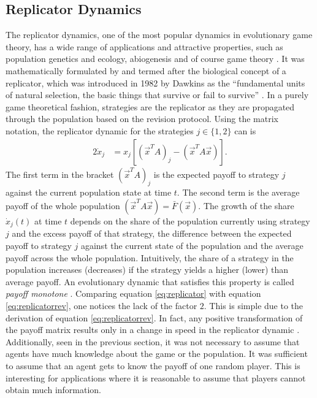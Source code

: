 \subsection{Replicator Dynamics}
\label{sec:replicatordynamic}
The replicator dynamics, one of the most popular dynamics in 
evolutionary game theory, has a wide range of applications and 
attractive properties, such as population genetics and ecology, abiogenesis and
of course game theory \parencite[203]{hofbauer_evolutionary_1998}. 
It was mathematically formulated by \textcite{taylor_evolutionary_1978} and 
termed after the biological concept of a replicator, which was 
introduced in 1982 by Dawkins as the ``fundamental units of natural selection,
the basic things that survive or fail to survive''
\parencite[254]{dawkins_selfish_2016}. In a purely game theoretical fashion,
strategies are the replicator as they are propagated through the population
based on the revision protocol. Using the matrix notation, 
the replicator dynamic  
for the strategies $j \in \{1,2\}$ can is 
\begin{alignat}{2}
        \dot{x}_j &= x_j\left[\left(\vec{x}^T A\right)_j -
        \left(\vec{x}^T A \vec{x}\right)\right]. 
        \label{eq:replicator}
\end{alignat}
The first term in the bracket $(\vec{x}^T A)_j$ is the expected payoff to 
strategy $j$ against the current population state at time $t$. The second
term is the average payoff of the whole population 
$(\vec{x}^T A \vec{x}) =\bar{F}(\vec{x})$.
The growth of the share $\dot{x}_j(t)$ at time $t$ depends 
on the share of the population currently using strategy $j$ and the 
excess payoff of that strategy, the difference between the expected 
payoff to strategy $j$ against the current state of the population and the
average payoff across the whole population.
Intuitively, the share of a strategy in the population increases (decreases) 
if the strategy yields a higher (lower) than average payoff. 
An evolutionary dynamic that satisfies this property is called 
\textit{payoff monotone} \parencite[30]{szabo_evolutionary_2007}. 
Comparing equation \eqref{eq:replicator} with equation 
\eqref{eq:replicatorrev}, one notices the lack of the factor $2$. 
This is simple due to the derivation of equation \eqref{eq:replicatorrev}.
In fact, any positive transformation of the payoff matrix 
results only in a change in speed in the replicator dynamic
\parencite[73]{weibull_evolutionary_1997}.
Additionally, seen in the previous section, it was not 
necessary to assume that agents have much knowledge about the game or
the population. It was sufficient to assume that an agent gets to know the 
payoff of one random player. This is interesting for applications where it
is reasonable to assume that players cannot obtain much information.


